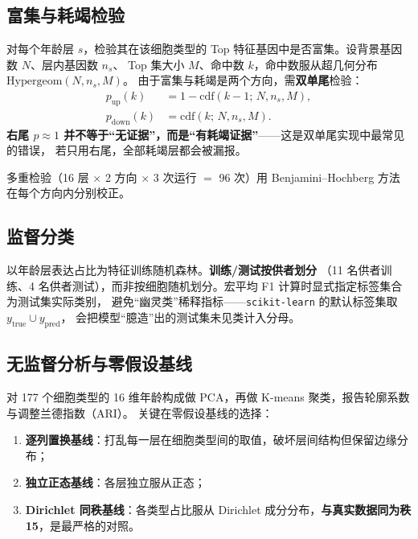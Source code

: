 \documentclass[numsec,webpdf,modern,large]{oup-authoring-template}
\begin{document}
\subsection{富集与耗竭检验}

对每个年龄层 $s$，检验其在该细胞类型的 Top 特征基因中是否富集。设背景基因数 $N$、层内基因数 $n_s$、
Top 集大小 $M$、命中数 $k$，命中数服从超几何分布 $\mathrm{Hypergeom}(N, n_s, M)$。
由于富集与耗竭是两个方向，需\textbf{双单尾}检验：
\begin{align}
  p_{\text{up}}(k)   &= 1 - \mathrm{cdf}(k-1;\, N, n_s, M), \label{eq:pup}\\
  p_{\text{down}}(k) &= \mathrm{cdf}(k;\, N, n_s, M). \label{eq:pdown}
\end{align}
\textbf{右尾 $p \approx 1$ 并不等于“无证据”，而是“有耗竭证据”}——这是双单尾实现中最常见的错误，
若只用右尾，全部耗竭层都会被漏报。

多重检验（16 层 $\times$ 2 方向 $\times$ 3 次运行 $=$ 96 次）用 Benjamini--Hochberg 方法\citep{benjamini1995}
在每个方向内分别校正。

\subsection{监督分类}

以年龄层表达占比为特征训练随机森林\citep{breiman2001}。\textbf{训练/测试按供者划分}
（11 名供者训练、4 名供者测试），而非按细胞随机划分。宏平均 F1 计算时显式指定标签集合为测试集实际类别，
避免“幽灵类”稀释指标——\texttt{scikit-learn} 的默认标签集取 $y_{\text{true}} \cup y_{\text{pred}}$，
会把模型“臆造”出的测试集未见类计入分母。

\subsection{无监督分析与零假设基线}

对 177 个细胞类型的 16 维年龄构成做 PCA，再做 K-means 聚类，报告轮廓系数与调整兰德指数（ARI）\citep{mccune2002}。
关键在零假设基线的选择：
\begin{enumerate}[label=(\roman*)]
  \item \textbf{逐列置换基线}：打乱每一层在细胞类型间的取值，破坏层间结构但保留边缘分布；
  \item \textbf{独立正态基线}：各层独立服从正态；
  \item \textbf{Dirichlet 同秩基线}：各类型占比服从 Dirichlet 成分分布，\textbf{与真实数据同为秩 15}，是最严格的对照。
\end{enumerate}
\end{document}
